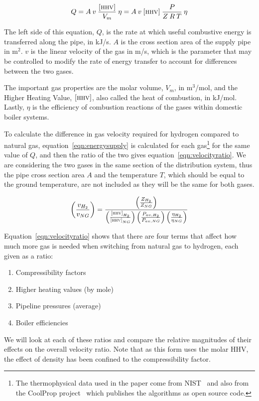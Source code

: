 \documentclass[5p]{elsarticle} %
\begin{document}
\begin{equation}
\label{eqn:energysupply}
    Q = A \: v \: \frac{\textsc{[\textsc{hhv}]}}{V_m} \: \eta
    = A \: v \: \textsc{[\textsc{hhv}]} \: \frac{P}{Z \: R \: T} \: \eta
\end{equation}

The left side of this equation, $Q$, is the rate at which useful combustive energy is transferred along the pipe, in kJ/s. 
$A$ is the cross section area of the supply pipe in m$^2$.
$v$ is the linear velocity of the gas in m/s, which is the parameter that may be controlled to modify the rate of energy transfer to account for differences between the two gases. 

The  important gas properties are the molar volume, $V_m$, in m$^3$/mol, and the Higher Heating Value, $\textsc{[\textsc{hhv}]}$, also called the heat of combustion, in kJ/mol. 
Lastly, $\eta$ is the efficiency of combustion reactions of the gases within domestic boiler systems. 

To calculate the difference in gas velocity required for hydrogen compared to natural gas,   equation~\eqref{eqn:energysupply} is  calculated
for each gas\footnote{
The thermophysical data used in the paper come from NIST~\citep{Huber2022} and also from the CoolProp project~\citep{coolprop} which publishes the algorithms as open source code.}
for the same value of $Q$, and then the ratio of the two gives equation~\eqref{eqn:velocityratio}. 
We are considering the two gases in the same section of the distribution system, thus the pipe cross section area $A$ and the temperature $T$, which should be equal to the ground temperature, are not included as they will be the same for both gases.

\begin{equation}
\label{eqn:velocityratio}
    \left(\frac{v_{H_2}}{v_{NG}}\right) = 
    \frac{
        \left(\frac{Z_{H_2}}{Z_{NG}}\right) 
    }{
        \left(\frac{\textsc{[\textsc{hhv}]}_{H_2}}{\textsc{[\textsc{hhv}]}_{NG}}\right)  
        \left(\frac{P_{av,H_2}}{P_{av,NG}}\right)
        \left(\frac{\eta_{H_2}}{\eta_{NG}}\right)
    }
\end{equation}

Equation~\eqref{eqn:velocityratio} shows that there are four terms that affect how much more gas is needed when switching from natural gas to hydrogen, each given as a ratio: 
\begin{enumerate}
    \item Compressibility factors
    \item Higher heating values (by mole)
    \item Pipeline pressures (average)
    \item Boiler efficiencies
\end{enumerate}
We will look at each of these ratios and compare the relative magnitudes of their effects on the overall velocity ratio.
Note that as this form uses the molar HHV, the effect of density has been confined to the compressibility factor.
\end{document}
